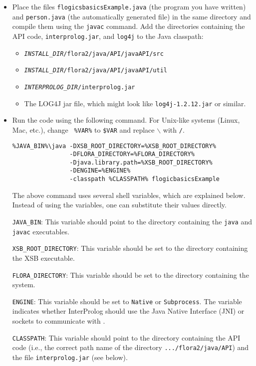 \begin{itemize}
\item Place the files {\tt flogicsbasicsExample.java} (the program you have
  written) and {\tt person.java} (the automatically generated file)
in the same directory and compile them using the {\tt javac}  command. Add
the directories containing the API code, 
{\tt interprolog.jar}, and \texttt{log4j}  to the Java classpath:
\begin{itemize}
\item  \texttt{\textit{INSTALL\_DIR}/flora2/java/API/javaAPI/src} 
\item  \texttt{\textit{INSTALL\_DIR}/flora2/java/API/javaAPI/util}
\item  \texttt{\textit{INTERPROLOG\_DIR}/interprolog.jar}
\item  The LOG4J jar file, which might look like \texttt{log4j-1.2.12.jar}
  or similar. 
\end{itemize}


\item Run the code using the following command. For Unix-like systems
  (Linux, Mac, etc.), change {\tt
    \%VAR\%} to {\tt \$VAR} and replace $\backslash$ with {\tt /}.
\begin{verbatim}
%JAVA_BIN%\java -DXSB_ROOT_DIRECTORY=%XSB_ROOT_DIRECTORY%
                -DFLORA_DIRECTORY=%FLORA_DIRECTORY%
                -Djava.library.path=%XSB_ROOT_DIRECTORY%
                -DENGINE=%ENGINE%
                -classpath %CLASSPATH% flogicbasicsExample
\end{verbatim}

  The above command uses several shell variables, which are explained below.
  Instead of using the variables, one can substitute their values directly.

{\tt JAVA\_BIN}: This variable should point to the directory
containing the {\tt java}  and {\tt javac}  executables.

{\tt XSB\_ROOT\_DIRECTORY}: This variable should be set to the
directory containing the XSB executable.

{\tt FLORA\_DIRECTORY}: This variable should be set to the directory
containing the \FLSYSTEM system.

{\tt ENGINE}: This variable should be set to
{\tt Native} or  {\tt Subprocess}. The variable indicates whether InterProlog
should use the Java Native Interface (JNI) or sockets to communicate with
\FLSYSTEM.

{\tt CLASSPATH}: This variable should point to the directory
containing the API code (i.e., the correct path name of the
directory {\tt .../flora2/java/API})  and the file {\tt interprolog.jar}
(see below).

\end{itemize}

